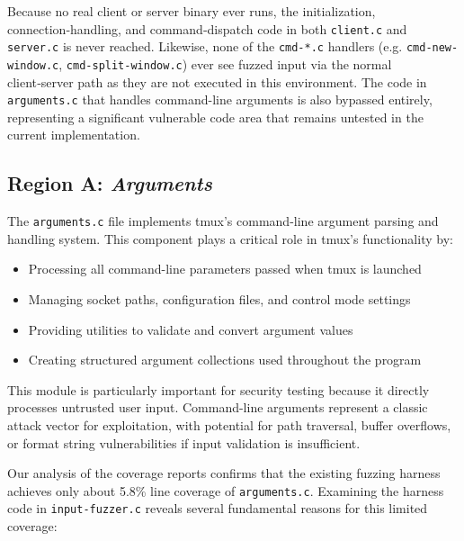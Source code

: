 Because no real client or server binary ever runs, the initialization, connection‑handling, and command‑dispatch code in both \texttt{client.c} and \texttt{server.c} is never reached. Likewise, none of the \texttt{cmd-*.c} handlers (e.g. \texttt{cmd-new-window.c}, \texttt{cmd-split-window.c}) ever see fuzzed input via the normal client‑server path as they are not executed in this environment. The code in \texttt{arguments.c} that handles command-line arguments is also bypassed entirely, representing a significant vulnerable code area that remains untested in the current implementation.


\subsection*{Region A: \textit{Arguments}}

The \texttt{arguments.c} file implements tmux's command-line argument parsing and handling system. This component plays a critical role in tmux's functionality by:

\begin{itemize}
  \item Processing all command-line parameters passed when tmux is launched
  \item Managing socket paths, configuration files, and control mode settings
  \item Providing utilities to validate and convert argument values
  \item Creating structured argument collections used throughout the program
\end{itemize}

This module is particularly important for security testing because it directly processes untrusted user input. Command-line arguments represent a classic attack vector for exploitation, with potential for path traversal, buffer overflows, or format string vulnerabilities if input validation is insufficient.

Our analysis of the coverage reports confirms that the existing fuzzing harness achieves only about 5.8\% line coverage of \texttt{arguments.c}. Examining the harness code in \texttt{input-fuzzer.c} reveals several fundamental reasons for this limited coverage:

